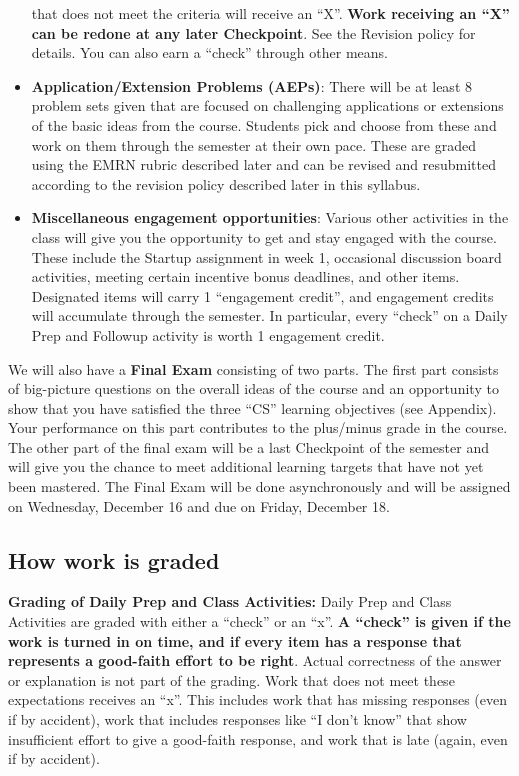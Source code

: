 \documentclass[]{article}
\begin{document}
\begin{itemize}
  that does not meet the criteria will receive an ``X''. \textbf{Work
  receiving an ``X'' can be redone at any later Checkpoint}. See the
  Revision policy for details. You can also earn a ``check'' through
  other means.
\item
  \textbf{Application/Extension Problems (AEPs)}: There will be at least
  8 problem sets given that are focused on challenging applications or
  extensions of the basic ideas from the course. Students pick and
  choose from these and work on them through the semester at their own
  pace. These are graded using the EMRN rubric described later and can
  be revised and resubmitted according to the revision policy described
  later in this syllabus.
\item
  \textbf{Miscellaneous engagement opportunities}: Various other
  activities in the class will give you the opportunity to get and stay
  engaged with the course. These include the Startup assignment in week
  1, occasional discussion board activities, meeting certain incentive
  bonus deadlines, and other items. Designated items will carry 1
  ``engagement credit'', and engagement credits will accumulate through
  the semester. In particular, every ``check'' on a Daily Prep and
  Followup activity is worth 1 engagement credit.
\end{itemize}

We will also have a \textbf{Final Exam} consisting of two parts. The
first part consists of big-picture questions on the overall ideas of the
course and an opportunity to show that you have satisfied the three
``CS'' learning objectives (see Appendix). Your performance on this part
contributes to the plus/minus grade in the course. The other part of the
final exam will be a last Checkpoint of the semester and will give you
the chance to meet additional learning targets that have not yet been
mastered. The Final Exam will be done asynchronously and will be
assigned on Wednesday, December 16 and due on Friday, December 18.

\hypertarget{how-work-is-graded}{%
\subsection{How work is graded}\label{how-work-is-graded}}

\textbf{Grading of Daily Prep and Class Activities:} Daily Prep and
Class Activities are graded with either a ``check'' or an ``x''.
\textbf{A ``check'' is given if the work is turned in on time, and if
every item has a response that represents a good-faith effort to be
right}. Actual correctness of the answer or explanation is not part of
the grading. Work that does not meet these expectations receives an
``x''. This includes work that has missing responses (even if by
accident), work that includes responses like ``I don't know'' that show
insufficient effort to give a good-faith response, and work that is late
(again, even if by accident).
\end{document}
